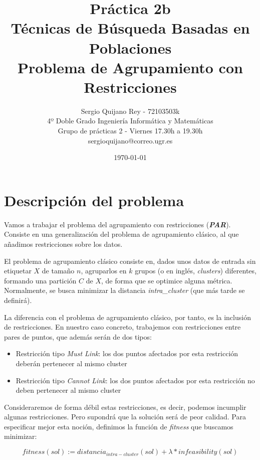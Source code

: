 \documentclass[11pt]{article}
\title{
    {Práctica 2b}\\
    {Técnicas de Búsqueda Basadas en Poblaciones}\\
    {Problema de Agrupamiento con Restricciones}\\
}
\author{
    {Sergio Quijano Rey - 72103503k}\\
    {4º Doble Grado Ingeniería Informática y Matemáticas}\\
    {Grupo de prácticas 2 - Viernes 17.30h a 19.30h}\\
    {sergioquijano@correo.ugr.es}
}
\date{\today}
\begin{document}
\maketitle
\pagebreak

\tableofcontents

\listoffigures




\pagebreak

\section{Descripción del problema}

Vamos a trabajar el problema del agrupamiento con restricciones (\textbf{\emph{PAR}}). Consiste en una generalización del problema de agrupamiento clásico, al que añadimos restricciones sobre los datos.

El problema de agrupamiento clásico consiste en, dados unos datos de entrada sin etiquetar $X$ de tamaño $n$, agruparlos en $k$ grupos (o en inglés, \emph{clusters}) diferentes, formando una partición $C$ de $X$, de forma que se optimice alguna métrica. Normalmente, se busca minimizar la distancia \emph{intra\_cluster} (que más tarde se definirá).

La diferencia con el problema de agrupamiento clásico, por tanto, es la inclusión de restricciones. En nuestro caso concreto, trabajemos con restricciones entre pares de puntos, que además serán de dos tipos:

\begin{itemize}
    \item Restricción tipo \emph{Must Link}: los dos puntos afectados por esta restricción deberán pertenecer al mismo cluster
    \item Restricción tipo \emph{Cannot Link}: los dos puntos afectados por esta restricción no deben pertenecer al mismo cluster
\end{itemize}

Consideraremos de forma débil estas restricciones, es decir, podemos incumplir algunas restricciones. Pero supondrá que la solución será de peor calidad. Para especificar mejor esta noción, definimos la función de \emph{fitness} que buscamos minimizar:

\begin{displaymath}
    fitness(sol) := distancia_{intra-cluster}(sol) + \lambda * infeasibility(sol)
\end{displaymath}
\end{document}
